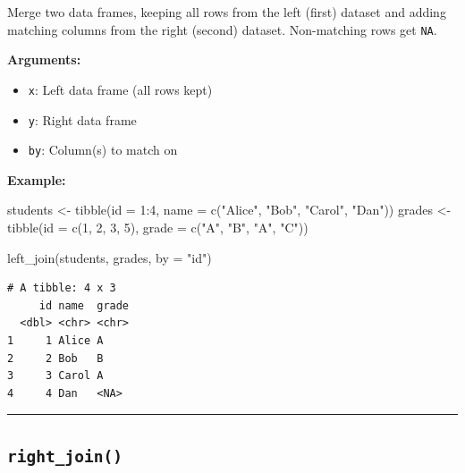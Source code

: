 \documentclass[
  letterpaper,
  DIV=11,
  numbers=noendperiod]{scrreprt}
\newenvironment{Shaded}{\begin{snugshade}}{\end{snugshade}}
\newcommand{\AttributeTok}[1]{\textcolor[rgb]{0.40,0.45,0.13}{#1}}
\newcommand{\DecValTok}[1]{\textcolor[rgb]{0.68,0.00,0.00}{#1}}
\newcommand{\FunctionTok}[1]{\textcolor[rgb]{0.28,0.35,0.67}{#1}}
\newcommand{\NormalTok}[1]{\textcolor[rgb]{0.00,0.23,0.31}{#1}}
\newcommand{\OtherTok}[1]{\textcolor[rgb]{0.00,0.23,0.31}{#1}}
\newcommand{\SpecialCharTok}[1]{\textcolor[rgb]{0.37,0.37,0.37}{#1}}
\newcommand{\StringTok}[1]{\textcolor[rgb]{0.13,0.47,0.30}{#1}}
\providecommand{\tightlist}{%
  \setlength{\itemsep}{0pt}\setlength{\parskip}{0pt}}
\begin{document}
Merge two data frames, keeping all rows from the left (first) dataset
and adding matching columns from the right (second) dataset.
Non-matching rows get \texttt{NA}.

\textbf{Arguments:}

\begin{itemize}
\tightlist
\item
  \texttt{x}: Left data frame (all rows kept)
\item
  \texttt{y}: Right data frame
\item
  \texttt{by}: Column(s) to match on
\end{itemize}

\textbf{Example:}

\begin{Shaded}
\begin{Highlighting}[]
\NormalTok{students }\OtherTok{\textless{}{-}} \FunctionTok{tibble}\NormalTok{(}\AttributeTok{id =} \DecValTok{1}\SpecialCharTok{:}\DecValTok{4}\NormalTok{, }\AttributeTok{name =} \FunctionTok{c}\NormalTok{(}\StringTok{"Alice"}\NormalTok{, }\StringTok{"Bob"}\NormalTok{, }\StringTok{"Carol"}\NormalTok{, }\StringTok{"Dan"}\NormalTok{))}
\NormalTok{grades   }\OtherTok{\textless{}{-}} \FunctionTok{tibble}\NormalTok{(}\AttributeTok{id =} \FunctionTok{c}\NormalTok{(}\DecValTok{1}\NormalTok{, }\DecValTok{2}\NormalTok{, }\DecValTok{3}\NormalTok{, }\DecValTok{5}\NormalTok{), }\AttributeTok{grade =} \FunctionTok{c}\NormalTok{(}\StringTok{"A"}\NormalTok{, }\StringTok{"B"}\NormalTok{, }\StringTok{"A"}\NormalTok{, }\StringTok{"C"}\NormalTok{))}

\FunctionTok{left\_join}\NormalTok{(students, grades, }\AttributeTok{by =} \StringTok{"id"}\NormalTok{)}
\end{Highlighting}
\end{Shaded}

\begin{verbatim}
# A tibble: 4 x 3
     id name  grade
  <dbl> <chr> <chr>
1     1 Alice A    
2     2 Bob   B    
3     3 Carol A    
4     4 Dan   <NA> 
\end{verbatim}

\begin{center}\rule{0.5\linewidth}{0.5pt}\end{center}

\subsection{\texorpdfstring{\texttt{right\_join()}}{right\_join()}}\label{right_join-1}
\end{document}
